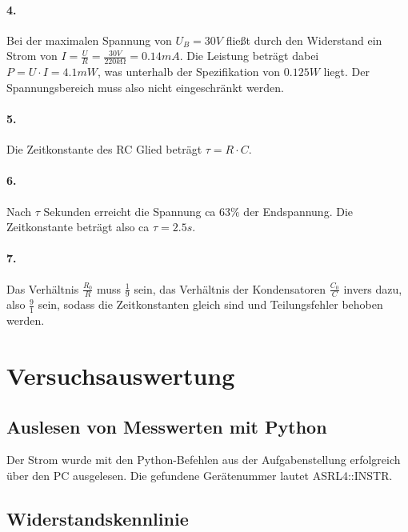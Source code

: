 \documentclass[a4paper]{article}
\begin{document}
    \paragraph{4.}
    Bei der maximalen Spannung von $U_B=30\si{V}$ fließt durch den Widerstand ein Strom von $I=\frac{U}{R}=\frac{30\si{V}}{220\si{k\ohm}}=0.14\si{mA}$. Die Leistung beträgt dabei $P=U\cdot I=4.1\si{mW}$, was unterhalb der Spezifikation von $0.125\si{W}$ liegt. Der Spannungsbereich muss also nicht eingeschränkt werden.
    
    \paragraph{5.}
    Die Zeitkonstante des RC Glied beträgt $\tau=R\cdot C$.
    
    \paragraph{6.}
    Nach $\tau$ Sekunden erreicht die Spannung ca $63\%$ der Endspannung. Die Zeitkonstante beträgt also ca $\tau=2.5\si{s}$.
    
    \paragraph{7.}
    Das Verhältnis $\frac{R_0}{R}$ muss $\frac{1}{9}$ sein, das Verhältnis der Kondensatoren $\frac{C_0}{C}$ invers dazu, also $\frac{9}{1}$ sein, sodass die Zeitkonstanten gleich sind und Teilungsfehler behoben werden.

\section{Versuchsauswertung}
    \subsection{Auslesen von Messwerten mit Python}
    
    Der Strom wurde mit den Python-Befehlen aus der Aufgabenstellung erfolgreich über den PC ausgelesen. Die gefundene Gerätenummer lautet ASRL4::INSTR.
 
    \subsection{Widerstandskennlinie}
    
\end{document}
